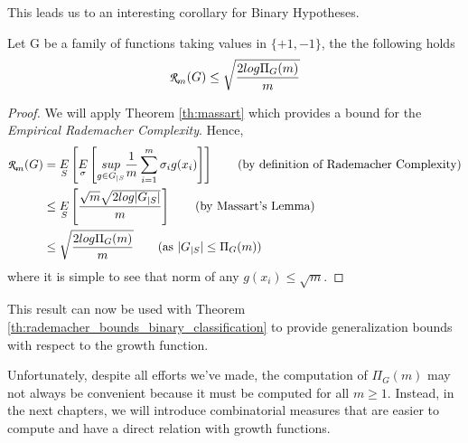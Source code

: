 \documentclass[../toml]{subfiles}
\begin{document}
This leads us to an interesting corollary for Binary Hypotheses.

\begin{corollary} \label{corr:massart}
Let G be a family of functions taking values in $\{+1,-1\}$, the the following holds
\begin{align}
\cursive{R}_m(G) \leq \sqrt{\frac{2log\Pi_G(m)}{m}}
\end{align}
\end{corollary}
\begin{proof}
We will apply Theorem \ref{th:massart} which provides a bound for the
\textit{Empirical Rademacher Complexity}. Hence,
\begin{align}
\cursive{R}_m(G) &= \underset{S}{E} \left[ \underset{\sigma}{E}\left[ \underset{g \in G_{|S}}{sup} \frac{1}{m} \sum_{i=1}^{m} \sigma_i g(x_i) \right] \right] \tag{by definition of Rademacher Complexity} \\
&\leq \underset{S}{E} \left[ \frac{\sqrt{m} \sqrt{2 log |G_{|S}|}}{m} \right] \tag{by Massart's Lemma} \\
&\leq \sqrt{\frac{2log\Pi_G(m)}{m}} \tag{as $|G_{|S}| \leq \Pi_G(m)$}
\end{align}
where it is simple to see that norm of any $g(x_i) \leq \sqrt{m}$.
\end{proof}

This result can now be used with Theorem \ref{th:rademacher_bounds_binary_classification} to provide generalization bounds
with respect to the growth function.

Unfortunately, despite all efforts we've made, the computation of $\Pi_G(m)$ may
not always be convenient because it must be computed for all $m \geq 1$. Instead, in the
next chapters, we will introduce combinatorial measures that are easier to compute and have a direct relation with growth functions.
\end{document}
